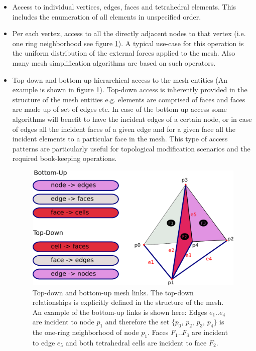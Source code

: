 \begin{itemize}
 \item Access to individual vertices, edges, faces and tetrahedral elements. This includes the enumeration of 
 all elements in unspecified order.
 
 \item Per each vertex, access to all the directly adjacent nodes to that vertex (i.e. one ring neighborhood see figure \ref{fig:meshlinks}). 
 A typical use-case for this operation is the uniform distribution of the external forces applied to the mesh. 
 Also many mesh simplification algorithms are based on such operators.
 
 \item Top-down and bottom-up hierarchical access to the mesh entities (An example is shown in figure \ref{fig:meshlinks}). Top-down access 
 is inherently provided in the structure of the mesh entities e.g. elements are comprised of faces and faces are made up of set of edges etc. 
 In case of the bottom up access some algorithms will benefit to have the incident edges of a certain node, or in case of edges all the incident 
 faces of a given edge and for a given face all the incident elements to a particular face in the mesh. This type of access patterns are particularly 
 useful for topological modification scenarios and the required book-keeping operations.
 
 \begin{figure}[H]
  \centering
  \includegraphics[width=0.8\linewidth]{figures/cutting/mesh_links.pdf}
  \caption{\label{fig:meshlinks}
  {Top-down and bottom-up mesh links. The top-down relationships is explicitly defined in the structure of the mesh.
  An example of the bottom-up links is shown here: Edges $e_1..e_4$ are incident to node $p_1$ and therefore the set 
  $\{p_0$, $p_2$, $p_3$, $p_4\}$} is the one-ring neighborhood of node $p_1$. Faces $F_1..F_3$ are incident to edge 
  $e_5$ and both tetrahedral cells are incident to face $F_2$.
}
\end{figure}


\end{itemize}
